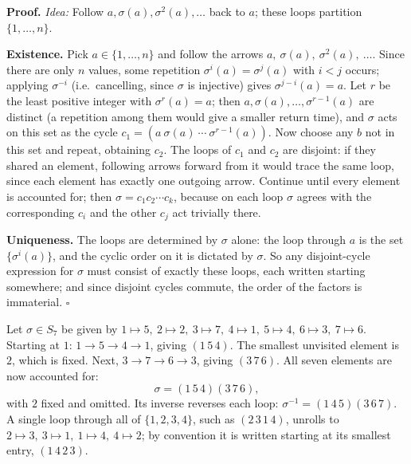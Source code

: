 \documentclass[11pt]{report}
\renewenvironment{proof}[1][Proof]{\noindent\textbf{#1.} }{\hfill$\square$\par\vspace{5pt}}
\begin{document}
\begin{proof}
\textit{Idea:} Follow $a, \sigma(a), \sigma^2(a), \ldots$ back to $a$; these loops partition $\{1, \ldots, n\}$.\par
\textbf{Existence.} Pick $a \in \{1, \ldots, n\}$ and follow the arrows $a,\ \sigma(a),\ \sigma^2(a),\ \ldots$. Since there are only $n$ values, some repetition $\sigma^i(a) = \sigma^j(a)$ with $i < j$ occurs; applying $\sigma^{-i}$ (i.e.\ cancelling, since $\sigma$ is injective) gives $\sigma^{j-i}(a) = a$. Let $r$ be the least positive integer with $\sigma^r(a) = a$; then $a, \sigma(a), \ldots, \sigma^{r-1}(a)$ are distinct (a repetition among them would give a smaller return time), and $\sigma$ acts on this set as the cycle $c_1 = (a\ \sigma(a)\ \cdots\ \sigma^{r-1}(a))$. Now choose any $b$ not in this set and repeat, obtaining $c_2$. The loops of $c_1$ and $c_2$ are disjoint: if they shared an element, following arrows forward from it would trace the same loop, since each element has exactly one outgoing arrow. Continue until every element is accounted for; then $\sigma = c_1 c_2 \cdots c_k$, because on each loop $\sigma$ agrees with the corresponding $c_i$ and the other $c_j$ act trivially there.

\textbf{Uniqueness.} The loops are determined by $\sigma$ alone: the loop through $a$ is the set $\{\sigma^i(a)\}$, and the cyclic order on it is dictated by $\sigma$. So any disjoint-cycle expression for $\sigma$ must consist of exactly these loops, each written starting somewhere; and since disjoint cycles commute, the order of the factors is immaterial.
\end{proof}

\begin{exbox}\label{ex:decomposing-permutation-s7}
Let $\sigma \in S_7$ be given by $1\mapsto5,\ 2\mapsto2,\ 3\mapsto7,\ 4\mapsto1,\ 5\mapsto4,\ 6\mapsto3,\ 7\mapsto6$. Starting at $1$: $1 \to 5 \to 4 \to 1$, giving $(1\,5\,4)$. The smallest unvisited element is $2$, which is fixed. Next, $3 \to 7 \to 6 \to 3$, giving $(3\,7\,6)$. All seven elements are now accounted for:
\[ \sigma = (1\,5\,4)(3\,7\,6), \]
with $2$ fixed and omitted. Its inverse reverses each loop: $\sigma^{-1} = (1\,4\,5)(3\,6\,7)$. A single loop through all of $\{1,2,3,4\}$, such as $(2\,3\,1\,4)$, unrolls to $2\mapsto3,\ 3\mapsto1,\ 1\mapsto4,\ 4\mapsto2$; by convention it is written starting at its smallest entry, $(1\,4\,2\,3)$.
\end{exbox}
\end{document}
